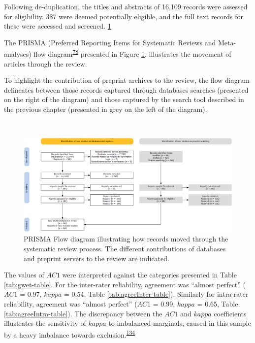 \documentclass[a4paper, twoside]{templates/ociamthesis}
\newcommand{\blandscape}{\begin{landscape}}
\newcommand{\elandscape}{\end{landscape}}
\begin{document}
Following de-duplication, the titles and abstracts of 16,109 records were assessed for eligibility. 387 were deemed potentially eligible, and the full text records for these were accessed and screened. \ref{fig:prisma-flow-fig}

The PRISMA (Preferred Reporting Items for Systematic Reviews and Meta-analyses) flow diagram\textsuperscript{\protect\hyperlink{ref-page2021}{78}} presented in Figure \ref{fig:prisma-flow-fig}, illustrates the movement of articles through the review.

To highlight the contribution of preprint archives to the review, the flow diagram delineates between those records captured through databases searches (presented on the right of the diagram) and those captured by the search tool described in the previous chapter (presented in grey on the left of the diagram).

\blandscape{}

~





\begin{figure}[H]
\includegraphics[width=1\linewidth]{figures/sys-rev/prismaflow} \caption[PRISMA flow diagram]{PRISMA Flow diagram illustrating how records moved through the systematic review process. The different contributions of databases and preprint servers to the review are indicated.}\label{fig:prisma-flow-fig}
\end{figure}

\elandscape{}

The values of \(AC1\) were interpreted against the categories presented in Table \ref{tab:gwet-table}. For the inter-rater reliability, agreement was ``almost perfect'' (\(AC1\) = 0.97, \(kappa\) = 0.54, Table \ref{tab:agreeInter-table}). Similarly for intra-rater reliability, agreement was ``almost perfect'' (\(AC1\) = 0.99, \(kappa\) = 0.65, Table \ref{tab:agreeIntra-table}). The discrepancy between the \(AC1\) and \(kappa\) coefficients illustrates the sensitivity of \(kappa\) to imbalanced marginals, caused in this sample by a heavy imbalance towards exclusion.\textsuperscript{\protect\hyperlink{ref-feinstein1990}{134}}
\end{document}
